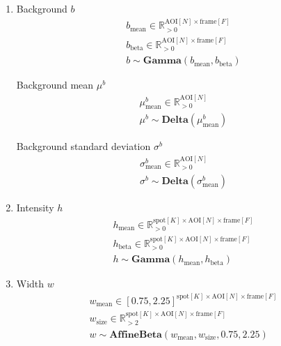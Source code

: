 \begin{enumerate}
    \item Background $b$
    \begin{gather*}
        b_\mathrm{mean} \in \mathbb{R}_{>0}^{\mathrm{AOI}[N] \times \mathrm{frame}[F]} \\
        b_\mathrm{beta} \in \mathbb{R}_{>0}^{\mathrm{AOI}[N] \times \mathrm{frame}[F]} \\
        b \sim \mathbf{Gamma}(b_\mathrm{mean}, b_\mathrm{beta})
    \end{gather*}
    
    Background mean $\mu^b$
    \begin{gather*}
        \mu^b_\mathrm{mean} \in \mathbb{R}_{>0}^{\mathrm{AOI}[N]} \\
        \mu^b \sim \mathbf{Delta}(\mu^b_\mathrm{mean})
    \end{gather*}
    
    Background standard deviation $\sigma^b$
    \begin{gather*}
        \sigma^b_\mathrm{mean} \in \mathbb{R}_{>0}^{\mathrm{AOI}[N]} \\
        \sigma^b \sim \mathbf{Delta}(\sigma^b_\mathrm{mean})
    \end{gather*}
    
    \item Intensity $h$
    \begin{gather*}
        h_\mathrm{mean} \in \mathbb{R}_{>0}^{\mathrm{spot}[K] \times \mathrm{AOI}[N] \times \mathrm{frame}[F]} \\
        h_\mathrm{beta} \in \mathbb{R}_{>0}^{\mathrm{spot}[K] \times \mathrm{AOI}[N] \times \mathrm{frame}[F]} \\
        h \sim \mathbf{Gamma}(h_\mathrm{mean}, h_\mathrm{beta})
    \end{gather*}
    
    \item Width $w$
    \begin{gather*}
        w_\mathrm{mean} \in [0.75, 2.25]^{\mathrm{spot}[K] \times \mathrm{AOI}[N] \times \mathrm{frame}[F]} \\
        w_\mathrm{size} \in \mathbb{R}_{>2}^{\mathrm{spot}[K] \times \mathrm{AOI}[N] \times \mathrm{frame}[F]} \\
        w \sim \mathbf{AffineBeta}(w_\mathrm{mean}, w_\mathrm{size}, 0.75, 2.25)
    \end{gather*}
    

\end{enumerate}
